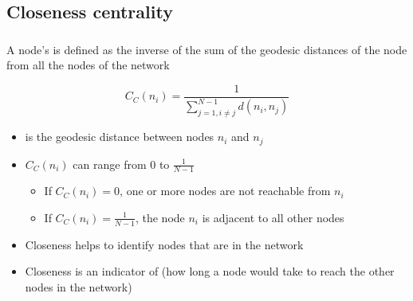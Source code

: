\documentclass[8pt]{beamer}
\begin{document}

\subsection{Closeness centrality}

\begin{frame}
\frametitle{\insertsection}
\framesubtitle{\insertsubsection}


A node's {\color{blue}{closeness centrality}} is defined as the inverse of the sum of the geodesic distances of the node from all the nodes of the network


\centering
\begin{equation*}
C_C(n_i) = \frac{1}{\sum_{j=1, i \neq j}^{N-1} d(n_i, n_j)}
\end{equation*}

\begin{itemize}
\item {} is the geodesic distance between nodes $n_i$ and $n_j$
\item $C_C(n_i)$ can range from $0$ to $\frac{1}{N-1}$
	\begin{itemize}
	\item If $C_C(n_i) = 0$, one or more nodes are not reachable from $n_i$
	\item If $C_C(n_i) = \frac{1}{N-1}$, the node $n_i$ is adjacent to all other nodes
	\end{itemize}
\item Closeness helps to identify nodes that are {\color{blue}{close to most of the nodes}} in the network
\item Closeness is an indicator of {\color{blue}{speed of information dissemination}} (how long a node would take to reach the other nodes in the network)
\end{itemize}

\end{frame}
\end{document}
